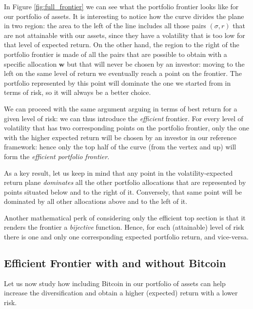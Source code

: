 In Figure \ref{fig:full_frontier} we can see what the portfolio frontier looks like for our portfolio of assets. 
It is interesting to notice how the curve divides the plane in two region: the area to the left of the line includes all those pairs $(\sigma, r)$ that are not attainable with our assets, since they have a volatility that is too low for that level of expected return. On the other hand, the region to the right of the portfolio frontier is made of all the pairs that are possible to obtain with a specific allocation $\mathbf{w}$ but that will never be chosen by an investor: moving to the left on the same level of return we eventually reach a point on the frontier. The portfolio represented by this point will dominate the one we started from in terms of risk, so it will always be a better choice.

We can proceed with the same argument arguing in terms of best return for a given level of risk: we can thus introduce the \textit{efficient} frontier. For every level of volatility that has two corresponding points on the portfolio frontier, only the one with the higher expected return will be chosen by an investor in our reference framework: hence only the top half of the curve (from the vertex and up) will form the \textit{efficient portfolio frontier}.

As a key result, let us keep in mind that any point in the volatility-expected return plane \textit{dominates} all the other portfolio allocations that are represented by points situated below and to the right of it. Conversely, that same point will be dominated by all other allocations above and to the left of it. 

Another mathematical perk of considering only the efficient top section is that it renders the frontier a \textit{bijective} function. Hence, for each (attainable) level of risk there is one and only one corresponding expected portfolio return, and vice-versa.


\subsection{Efficient Frontier with and without Bitcoin}

Let us now study how including Bitcoin in our portfolio of assets can help increase the diversification and obtain a higher (expected) return with a lower risk.

